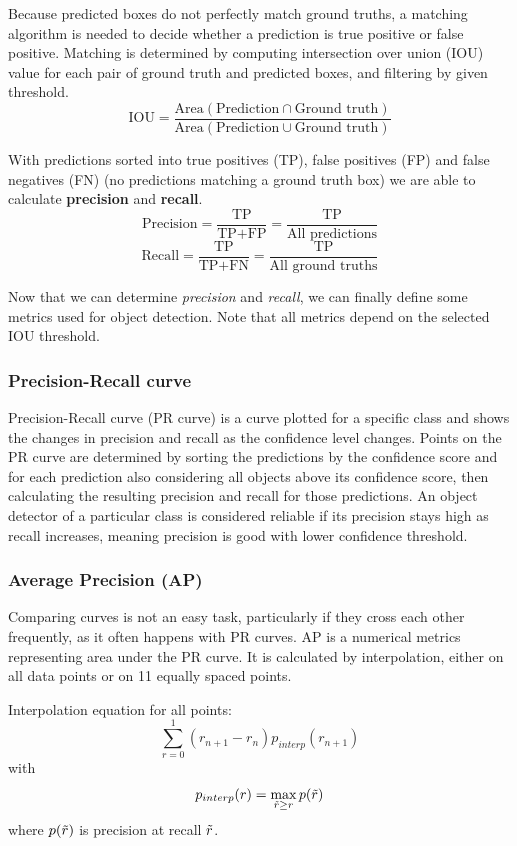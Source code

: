 Because predicted boxes do not perfectly match ground truths, a matching algorithm is needed to decide whether a prediction is true positive or false positive. Matching is determined by computing intersection over union (IOU) value for each pair of ground truth and predicted boxes, and filtering by given threshold.
$$\text{IOU} = \frac{\text{Area}(\text{Prediction} \cap \text{Ground truth})}{\text{Area}(\text{Prediction} \cup \text{Ground truth})}$$

With predictions sorted into true positives (TP), false positives (FP) and false negatives (FN) (no predictions matching a ground truth box) we are able to calculate \textbf{precision} and \textbf{recall}.
$$\text{Precision} = \frac{\text{TP}}{\text{TP}+\text{FP}} = \frac{\text{TP}}{\text{All predictions}}$$
$$\text{Recall} = \frac{\text{TP}}{\text{TP}+\text{FN}} = \frac{\text{TP}}{\text{All ground truths}}$$

Now that we can determine \textit{precision} and \textit{recall}, we can finally define some metrics used for object detection. Note that all metrics depend on the selected IOU threshold.

\subsubsection{Precision-Recall curve}
Precision-Recall curve (PR curve) is a curve plotted for a specific class and shows the changes in precision and recall as the confidence level changes. Points on the PR curve are determined by sorting the predictions by the confidence score and for each prediction also considering all objects above its confidence score, then calculating the resulting precision and recall for those predictions. An object detector of a particular class is considered reliable if its precision stays high as recall increases, meaning precision is good with lower confidence threshold.

\subsubsection{Average Precision (AP)}
Comparing curves is not an easy task, particularly if they cross each other frequently, as it often happens with PR curves. AP is a numerical metrics representing area under the PR curve. It is calculated by interpolation, either on all data points or on 11 equally spaced points.

Interpolation equation for all points:
$$\sum_{r=0}^1 (r_{n+1} - r_n ) p_{interp}(r_{n+1})$$
with
$$p_{interp}(r) = \max_{\Tilde{r} \geq r} p(\Tilde{r})$$
where $p(\Tilde{r})$ is precision at recall $\Tilde{r}$.

